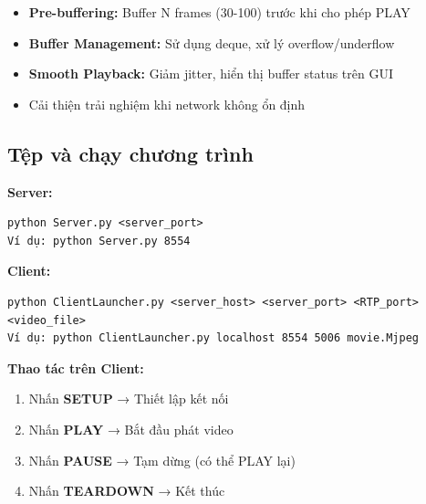 \begin{itemize}
    \item \textbf{Pre-buffering:} Buffer N frames (30-100) trước khi cho phép PLAY
    \item \textbf{Buffer Management:} Sử dụng deque, xử lý overflow/underflow
    \item \textbf{Smooth Playback:} Giảm jitter, hiển thị buffer status trên GUI
    \item Cải thiện trải nghiệm khi network không ổn định
\end{itemize}

\subsection{Tệp và chạy chương trình}

\textbf{Server:}
\begin{verbatim}
python Server.py <server_port>
Ví dụ: python Server.py 8554
\end{verbatim}

\textbf{Client:}
\begin{verbatim}
python ClientLauncher.py <server_host> <server_port> <RTP_port> <video_file>
Ví dụ: python ClientLauncher.py localhost 8554 5006 movie.Mjpeg
\end{verbatim}

\textbf{Thao tác trên Client:}
\begin{enumerate}
        \item Nhấn \textbf{SETUP} → Thiết lập kết nối
        \item Nhấn \textbf{PLAY} → Bắt đầu phát video
        \item Nhấn \textbf{PAUSE} → Tạm dừng (có thể PLAY lại)
        \item Nhấn \textbf{TEARDOWN} → Kết thúc
\end{enumerate}

\clearpage
